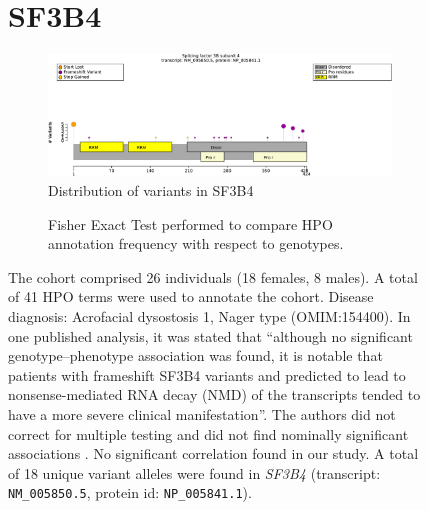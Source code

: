 \begin{figure}[htbp]
\section*{SF3B4}
\centering
\begin{subfigure}[b]{0.95\textwidth}
\centering
\includegraphics[width=\textwidth]{ img/SF3B4_protein_diagram.pdf} 
\captionsetup{justification=raggedright,singlelinecheck=false}
\caption{Distribution of variants in SF3B4}
\end{subfigure}

\vspace{2em}

\begin{subfigure}[b]{0.95\textwidth}
\centering
{}
\captionsetup{justification=raggedright,singlelinecheck=false}
\caption{Fisher Exact Test performed to compare HPO annotation frequency with respect to genotypes.}
\end{subfigure}

\vspace{2em}

\caption{The cohort comprised 26 individuals (18 females, 8 males). A total of 41 HPO terms were used to annotate the cohort. Disease diagnosis: Acrofacial dysostosis 1, Nager type (OMIM:154400). 
In one published analysis, it was stated that ``although no significant genotype–phenotype association was found, it is notable that patients with frameshift SF3B4 variants and predicted to lead to nonsense-mediated RNA 
decay (NMD) of the transcripts tended to have a more severe clinical manifestation''. The authors did not correct for multiple testing and did not find nominally significant associations \cite{PMID_35331022}.
No significant correlation found in our study. A total of 18 unique variant alleles were found in \textit{SF3B4} (transcript: \texttt{NM\_005850.5}, protein id: \texttt{NP\_005841.1}).}
\end{figure}

